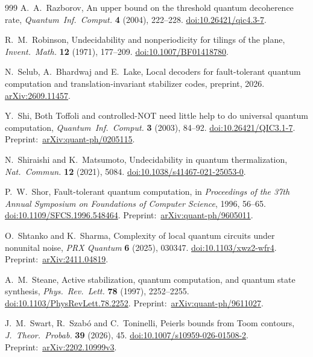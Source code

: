 \begin{thebibliography}{999}
A.~A.~Razborov,
An upper bound on the threshold quantum decoherence rate,
\emph{Quantum~Inf.~Comput.} \textbf{4} (2004), 222--228.
\href{https://doi.org/10.26421/qic4.3-7}{doi:10.26421/qic4.3-7}.

R.~M.~Robinson,
Undecidability and nonperiodicity for tilings of the plane,
\emph{Invent.~Math.} \textbf{12} (1971), 177--209.
\href{https://doi.org/10.1007/BF01418780}{doi:10.1007/BF01418780}.

N.~Selub, A.~Bhardwaj and E.~Lake,
Local decoders for fault-tolerant quantum computation and translation-invariant stabilizer codes,
preprint, 2026.
\href{https://arxiv.org/abs/2609.11457}{arXiv:2609.11457}.

Y.~Shi,
Both Toffoli and controlled-NOT need little help to do universal quantum computation,
\emph{Quantum~Inf.~Comput.} \textbf{3} (2003), 84--92.
\href{https://doi.org/10.26421/QIC3.1-7}{doi:10.26421/QIC3.1-7}.
Preprint:~\href{https://arxiv.org/abs/quant-ph/0205115}{arXiv:quant-ph/0205115}.

N.~Shiraishi and K.~Matsumoto,
Undecidability in quantum thermalization,
\emph{Nat.~Commun.} \textbf{12} (2021), 5084.
\href{https://doi.org/10.1038/s41467-021-25053-0}{doi:10.1038/s41467-021-25053-0}.

P.~W.~Shor,
Fault-tolerant quantum computation,
in \emph{Proceedings of the 37th Annual Symposium on Foundations of Computer Science},
1996, 56--65.
\href{https://doi.org/10.1109/SFCS.1996.548464}{doi:10.1109/SFCS.1996.548464}.
Preprint:~\href{https://arxiv.org/abs/quant-ph/9605011}{arXiv:quant-ph/9605011}.

O.~Shtanko and K.~Sharma,
Complexity of local quantum circuits under nonunital noise,
\emph{PRX Quantum} \textbf{6} (2025), 030347.
\href{https://doi.org/10.1103/xwz2-wfr4}{doi:10.1103/xwz2-wfr4}.
Preprint:~\href{https://arxiv.org/abs/2411.04819}{arXiv:2411.04819}.

A.~M.~Steane,
Active stabilization, quantum computation, and quantum state synthesis,
\emph{Phys.~Rev.~Lett.} \textbf{78} (1997), 2252--2255.
\href{https://doi.org/10.1103/PhysRevLett.78.2252}{doi:10.1103/PhysRevLett.78.2252}.
Preprint:~\href{https://arxiv.org/abs/quant-ph/9611027}{arXiv:quant-ph/9611027}.

J.~M.~Swart, R.~Szab\'o and C.~Toninelli,
Peierls bounds from Toom contours, \emph{J.~Theor.~Probab.} \textbf{39} (2026), 45.
\href{https://doi.org/10.1007/s10959-026-01508-2}{doi:10.1007/s10959-026-01508-2}. Preprint:~\href{https://arxiv.org/abs/2202.10999v3}{arXiv:2202.10999v3}.


\end{thebibliography}
